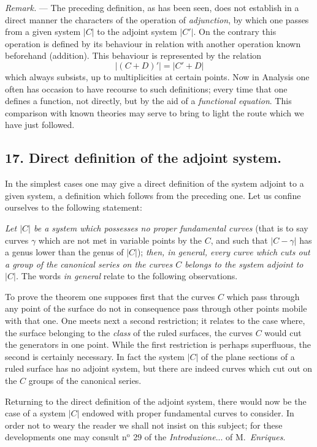 \documentclass{article}
\begin{document}

\emph{Remark.} --- The preceding definition, as has been seen, does not establish in a direct manner the characters of the operation of \emph{adjunction}, by which one passes from a given system $|C|$ to the adjoint system $|C'|$. On the contrary this operation is defined by its behaviour in relation with another operation known beforehand (addition). This behaviour is represented by the relation
\[
|(C + D)'| = |C' + D|
\]
which always subsists, up to multiplicities at certain points. Now in Analysis one often has occasion to have recourse to such definitions; every time that one defines a function, not directly, but by the aid of a \emph{functional equation}. This comparison with known theories may serve to bring to light the route which we have just followed.

\subsection*{17. Direct definition of the adjoint system.}

In the simplest cases one may give a direct definition of the system adjoint to a given system, a definition which follows from the preceding one. Let us confine ourselves to the following statement:

\emph{Let $|C|$ be a system which possesses no proper fundamental curves} (that is to say curves $\gamma$ which are not met in variable points by the $C$, and such that $|C - \gamma|$ has a genus lower than the genus of $|C|$); \emph{then, in general, every curve which cuts out a group of the canonical series on the curves $C$ belongs to the system adjoint to $|C|$.} The words \emph{in general} relate to the following observations.

To prove the theorem one supposes first that the curves $C$ which pass through any point of the surface do not in consequence pass through other points mobile with that one. One meets next a second restriction; it relates to the case where, the surface belonging to the \emph{class} of the ruled surfaces, the curves $C$ would cut the generators in one point. While the first restriction is perhaps superfluous, the second is certainly necessary. In fact the system $|C|$ of the plane sections of a ruled surface has no adjoint system, but there are indeed curves which cut out on the $C$ groups of the canonical series.

Returning to the direct definition of the adjoint system, there would now be the case of a system $|C|$ endowed with proper fundamental curves to consider. In order not to weary the reader we shall not insist on this subject; for these developments one may consult n${}^{\text{o}}$ 29 of the \emph{Introduzione}... of M.\ \emph{Enriques}.
\end{document}

